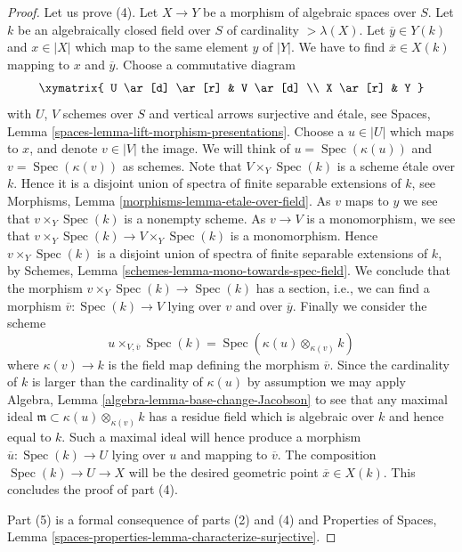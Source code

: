 \documentclass{stacks-project}
\theoremstyle{plain}
\theoremstyle{definition}
\theoremstyle{remark}
\numberwithin{equation}{subsection}
\def\Spec{\mathop{\mathrm{Spec}}}
\begin{document}
\begin{proof}
\medskip\noindent
Let us prove (4). Let $X \to Y$ be a morphism of algebraic spaces over $S$.
Let $k$ be an algebraically closed field over $S$ of cardinality
$> \lambda(X)$. Let $\overline{y} \in Y(k)$ and $x \in |X|$ which map to the
same element $y$ of $|Y|$.
We have to find $\overline{x} \in X(k)$ mapping to $x$ and $\overline{y}$.
Choose a commutative diagram
$$
\xymatrix{
U \ar[d] \ar[r] & V \ar[d] \\
X \ar[r] & Y
}
$$
with $U$, $V$ schemes over $S$ and vertical arrows surjective
and \'etale, see
Spaces, Lemma \ref{spaces-lemma-lift-morphism-presentations}.
Choose a $u \in |U|$ which maps to $x$, and denote $v \in |V|$ the image.
We will think of $u = \Spec(\kappa(u))$ and
$v = \Spec(\kappa(v))$ as schemes.
Note that $V \times_Y \Spec(k)$ is a scheme \'etale over $k$.
Hence it is a disjoint union of spectra of finite separable
extensions of $k$, see
Morphisms, Lemma \ref{morphisms-lemma-etale-over-field}.
As $v$ maps to $y$ we see that $v \times_Y \Spec(k)$ is a
nonempty scheme. As $v \to V$ is a monomorphism, we see that
$v \times_Y \Spec(k) \to V \times_Y \Spec(k)$
is a monomorphism. Hence $v \times_Y \Spec(k)$ is a disjoint
union of spectra of finite separable extensions of $k$, by
Schemes, Lemma \ref{schemes-lemma-mono-towards-spec-field}.
We conclude that the morphism
$v \times_Y \Spec(k) \to \Spec(k)$
has a section, i.e., we can find a morphism
$\overline{v} : \Spec(k) \to V$ lying over $v$ and over
$\overline{y}$. Finally we consider the scheme
$$
u \times_{V, \overline{v}} \Spec(k)
=
\Spec(\kappa(u) \otimes_{\kappa(v)} k)
$$
where $\kappa(v) \to k$ is the field map defining the morphism
$\overline{v}$. Since the cardinality of $k$ is larger than the cardinality
of $\kappa(u)$ by assumption we may apply
Algebra, Lemma \ref{algebra-lemma-base-change-Jacobson}
to see that any maximal ideal
$\mathfrak m \subset \kappa(u) \otimes_{\kappa(v)} k$
has a residue field which is algebraic over $k$ and hence equal to $k$.
Such a maximal ideal will hence produce a morphism
$\overline{u} : \Spec(k) \to U$ lying over $u$ and mapping to
$\overline{v}$. The composition $\Spec(k) \to U \to X$
will be the desired geometric point $\overline{x} \in X(k)$.
This concludes the proof of part (4).

\medskip\noindent
Part (5) is a formal consequence of parts (2) and (4) and
Properties of Spaces,
Lemma \ref{spaces-properties-lemma-characterize-surjective}.
\end{proof}
\end{document}
